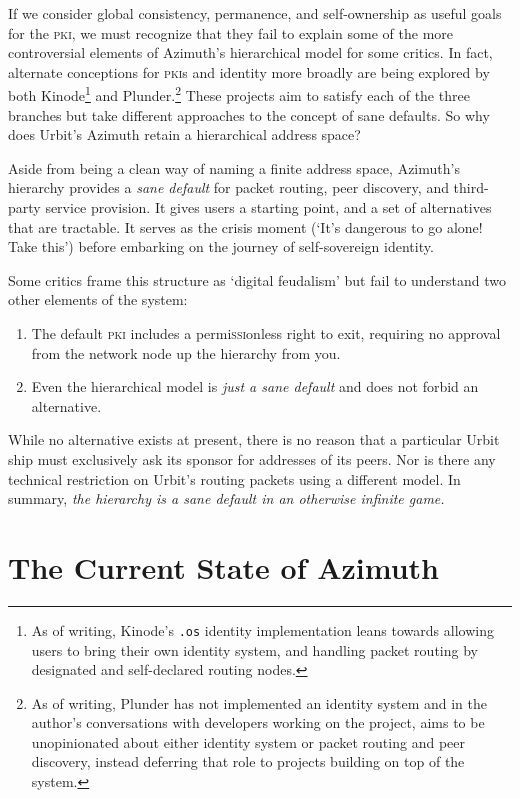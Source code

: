 \documentclass[twoside]{article}
\begin{document}
If we consider global consistency, permanence, and self-ownership as useful goals for the \textsc{pki}, we must recognize that they fail to explain some of the more controversial elements of Azimuth's hierarchical model for some critics. In fact, alternate conceptions for \textsc{pki}s and identity more broadly are being explored by both Kinode\footnote{As of writing, Kinode's \texttt{.os} identity implementation leans towards allowing users to bring their own identity system, and handling packet routing by designated and self-declared routing nodes.} and Plunder.\footnote{As of writing, Plunder has not implemented an identity system and in the author's conversations with developers working on the project, aims to be unopinionated about either identity system or packet routing and peer discovery, instead deferring that role to projects building on top of the system.} These projects aim to satisfy each of the three branches but take different approaches to the concept of sane defaults. So why does Urbit's Azimuth retain a hierarchical address space?

Aside from being a clean way of naming a finite address space, Azimuth's hierarchy provides a \emph{sane default} for packet routing, peer discovery, and third-party service provision. It gives users a starting point, and a set of alternatives that are tractable. It serves as the crisis moment (`It's dangerous to go alone! Take this') before embarking on the journey of self-sovereign identity.

Some critics frame this structure as `digital feudalism' but fail to understand two other elements of the system:
\begin{enumerate}
  \item  The default \textsc{pki} includes a permi\textsc{ssi}onless right to exit, requiring no approval from the network node up the hierarchy from you.
  \item  Even the hierarchical model is \emph{just a sane default} and does not forbid an alternative.
\end{enumerate}

\noindent
While no alternative exists at present, there is no reason that a particular Urbit ship must exclusively ask its sponsor for addresses of its peers. Nor is there any technical restriction on Urbit's routing packets using a different model. In summary, \emph{the hierarchy is a sane default in an otherwise infinite game.}

\section{The Current State of Azimuth}
\end{document}
